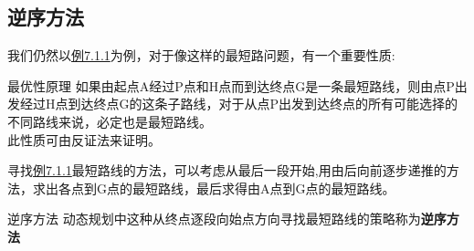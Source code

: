 \subsection{逆序方法}
我们仍然以\hyperref[eg:7.1.1]{例7.1.1}为例，对于像这样的最短路问题，有一个重要性质:
\begin{thmbox}{最优性原理}{}
如果由起点A经过P点和H点而到达终点G是一条最短路线，则由点P出发经过H点到达终点G的这条子路线，对于从点P出发到达终点的所有可能选择的不同路线来说，必定也是最短路线。
\\此性质可由反证法来证明。
\end{thmbox}
寻找\hyperref[eg:7.1.1]{例7.1.1}最短路线的方法，可以考虑从最后一段开始,用由后向前逐步递推的方法，求出各点到G点的最短路线，最后求得由A点到G点的最短路线。
\begin{dfnbox}{逆序方法}{}
	动态规划中这种从终点逐段向始点方向寻找最短路线的策略称为\textbf{逆序方法}
\end{dfnbox}
